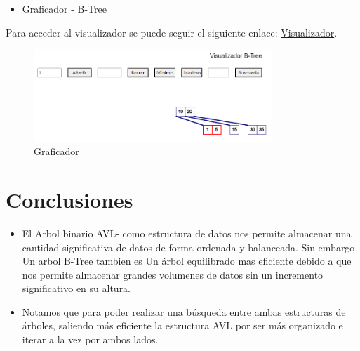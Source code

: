 \documentclass{article}
\begin{document}
\begin{enumerate}
\begin{itemize}
   \item Graficador - B-Tree
\end{itemize}

Para acceder al visualizador se puede seguir el siguiente enlace: \href{https://josuemzx.github.io/Implementacion_AVL_y_B-Tree/}{Visualizador}.

\begin{figure}[H]
\centering
\includegraphics[width=0.8\textwidth]{Img/display_Btree.png}
\caption{Graficador}
\end{figure}
        
    \end{enumerate}

\section{Conclusiones}

\begin{itemize}
            \item El Arbol binario AVL- como estructura de datos nos permite almacenar una cantidad significativa de datos de forma ordenada y balanceada. Sin embargo Un arbol B-Tree tambien es Un árbol equilibrado mas eficiente debido a que nos permite almacenar grandes volumenes de datos sin un incremento significativo en su altura.
\end{itemize}
\begin{itemize}
            \item Notamos que para poder realizar una búsqueda entre ambas estructuras de árboles, saliendo más eficiente la estructura AVL por ser más organizado e iterar a la vez por ambos lados.
\end{itemize}
	
		
	
\end{document}

